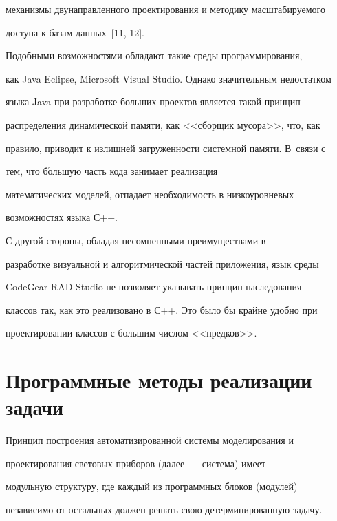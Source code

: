 механизмы двунаправленного проектирования и методику масштабируемого 


доступа к базам данных~[11, 12].


     


     Подобными возможностями обладают такие среды программирования, 


как Java Eclipse, Microsoft Visual Studio. Однако значительным недостатком 


языка Java при разработке больших проектов является такой принцип 


распределения динамической памяти, как <<сборщик мусора>>, что, как 


правило, приводит к излишней загруженности системной памяти. В~связи с 


тем, что б$\acute{\mbox{о}}$льшую часть кода занимает реализация 


математических моделей, отпадает необходимость в низкоуровневых 


возможностях языка С++.


     


     С другой стороны, обладая несомненными преимуществами в 


разработке визуальной и алгоритмической частей приложения, язык среды 


CodeGear RAD Studio не позволяет указывать принцип наследования 


классов так, как это реализовано в С++. Это было бы крайне удобно при 


проектировании классов с большим числом <<предков>>.


     


\section{Программные методы реализации задачи}





  Принцип построения автоматизированной сис\-те\-мы моделирования и 


проектирования световых приборов (далее~--- сис\-те\-ма) имеет 


модульную структуру, где каждый из программных блоков (модулей) 


независимо от остальных должен решать свою детерминированную задачу.


